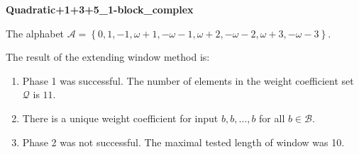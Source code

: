 \begin{exmp}
\textbf{ Quadratic+1+3+5\_1-block\_complex }

\label{ex:Quadratic+1+3+51-blockcomplex}

The alphabet $\mathcal{A} =\left\{0, 1, -1, \omega + 1, -\omega - 1, \omega + 2, -\omega - 2, \omega + 3, -\omega - 3\right\}$.

The result of the extending window method is:
\begin{enumerate}
    \item Phase 1 was successful.
The number of elements in the weight coefficient set $\mathcal{Q}$ is $11$.

    \item There is a unique weight coefficient for input $b,b,\dots,b$ for all $b\in\mathcal{B}$.

    \item Phase 2 was not successful. The maximal tested length of window was 10.

\end{enumerate}
\end{exmp}
